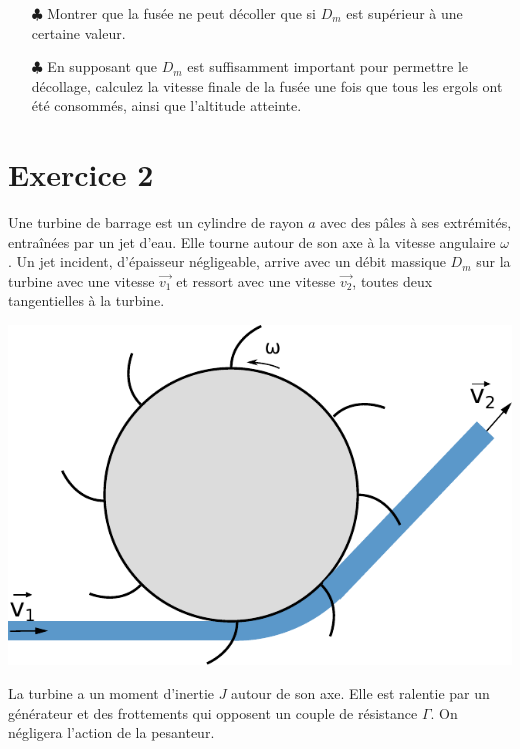 \documentclass{report}
\begin{document}
\begin{itemize}

\item[$\clubsuit$] Montrer que la fusée ne peut décoller que si $D_m$ est supérieur à une certaine valeur.
\item[$\clubsuit$] En supposant que $D_m$ est suffisamment important pour permettre le décollage, calculez la vitesse finale de la fusée une fois que tous les ergols ont été consommés, ainsi que l'altitude atteinte.

\end{itemize}

\newpage

\section*{Exercice 2}

Une turbine de barrage est un cylindre de rayon $a$ avec des pâles à ses extrémités, entraînées par un jet d'eau. Elle tourne autour de son axe à la vitesse angulaire $\omega$. Un jet incident, d'épaisseur négligeable, arrive avec un débit massique $D_m$ sur la turbine avec une vitesse $\vec{v_1}$ et ressort avec une vitesse $\vec{v_2}$, toutes deux tangentielles à la turbine.

\begin{center}
	\includegraphics[scale=0.5]{meca_flu7.pdf}
\end{center}

La turbine a un moment d'inertie $J$ autour de son axe. Elle est ralentie par un générateur et des frottements qui opposent un couple de résistance $\Gamma$. On négligera l'action de la pesanteur.
\end{document}
